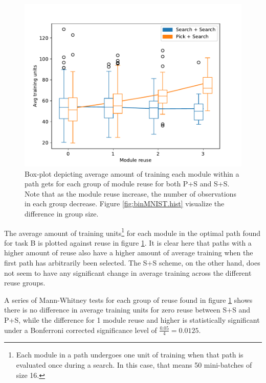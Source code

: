 \begin{figure}[t]
    \includegraphics[width=\textwidth]{Chapters/4.Experiments/exp1/figures/BIN_training_boxplot.pdf}
    \caption[Training boxplot for binary MNIST classification]{Box-plot depicting average amount of training each module within a path gets for each group of module reuse for both P+S and S+S. Note that as the module reuse increase, the number of observations in each group decrease. Figure \ref{fig:binMNIST.hist} visualize the difference in group size.}
    \label{fig:binMNIST.box}
\end{figure}

The average amount of training units\footnote{Each module in a path undergoes one unit of training when that path is evaluated once during a search. In this case, that means 50 mini-batches of size 16.} for each module in the optimal path found for task B is plotted against reuse in figure \ref{fig:binMNIST.box}. It is clear here that paths with a higher amount of reuse also have a higher amount of average training when the first path has arbitrarily been selected. The S+S scheme, on the other hand, does not seem to have any significant change in average training across the different reuse groups. 

A series of Mann-Whitney tests for each group of reuse found in figure \ref{fig:binMNIST.box} shows there is no difference in average training units for zero reuse between S+S and P+S, while the difference for 1 module reuse and higher is statistically significant under a Bonferroni corrected significance level of \(\frac{0.05}{4}=0.0125\).

